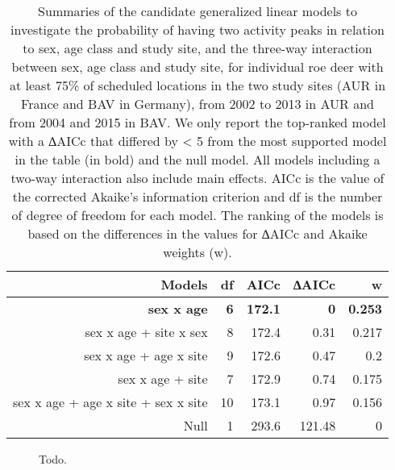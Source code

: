 \documentclass[a4paper,11pt]{article}
\begin{document}
\begin{table}[htbp]
  \centering
  \caption{Summaries of the candidate generalized linear models to investigate the probability of having two activity peaks in relation to sex, age class and study site, and the three-way interaction between sex, age class and study site, for individual roe deer with at least 75\% of scheduled locations in the two study sites (AUR in France and BAV in Germany), from 2002 to 2013 in AUR and from 2004 and 2015 in BAV. We only report the top-ranked model with a ∆AICc that differed by < 5 from the most supported model in the table (in bold) and the null model. All models including a two-way interaction also include main effects. AICc is the value of the corrected Akaike’s information criterion and df is the number of degree of freedom for each model. The ranking of the models is based on the differences in the values for ∆AICc and Akaike weights (w).}
  
    \begin{tabular}{rrrrr}
    \\
    \hline
        Models & df    & AICc  & ∆AICc & w \\
    \hline
    \textbf{sex x age} & \textbf{6}     & \textbf{172.1} & \textbf{0}     & \textbf{0.253} \\
    sex x age  + site x sex & 8     & 172.4 & 0.31  & 0.217 \\
    sex x age + age x site & 9     & 172.6 & 0.47  & 0.2 \\
    sex x age + site & 7     & 172.9 & 0.74  & 0.175 \\
    sex x age + age x site + sex x site & 10    & 173.1 & 0.97  & 0.156 \\
    Null  & 1     & 293.6 & 121.48 & 0 \\
    \hline
    \end{tabular}
  \label{tab:addlabel}
\end{table}



\begin{figure} [!h]
\centering
\caption{Todo.}
\end{figure}
\end{document}
